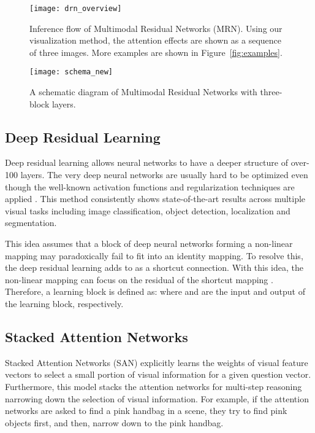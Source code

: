 \documentclass{article}
\begin{document}
\begin{figure}[t]
\centering
\begin{minipage}{.55\textwidth}
  \centering
  \texttt{[image: drn\_overview]}
  \caption{Inference flow of Multimodal Residual Networks (MRN). Using our visualization method, the attention effects are shown as a sequence of three images. More examples are shown in Figure~\ref{fig:examples}.}
  \label{fig:overview}
\end{minipage}
\hspace{26pt}
\begin{minipage}{.36\textwidth}
  \centering
  \texttt{[image: schema\_new]}
  \caption{A schematic diagram of Multimodal Residual Networks with three-block layers.}
  \label{fig:schema}
\end{minipage}
\end{figure}

\subsection{Deep Residual Learning}

Deep residual learning \cite{He2015} allows neural networks to have a deeper structure of over-100 layers. The very deep neural networks are usually hard to be optimized even though the well-known activation functions and regularization techniques are applied \cite{Nair2010,Hinton2012,Szegedy2015}. This method consistently shows state-of-the-art results across multiple visual tasks including image classification, object detection, localization and segmentation.

This idea assumes that a block of deep neural networks forming a non-linear mapping  may paradoxically fail to fit into an identity mapping. To resolve this, the deep residual learning adds  to  as a shortcut connection. With this idea, the non-linear mapping  can focus on the residual of the shortcut mapping . Therefore, a learning block is defined as: 
where  and  are the input and output of the learning block, respectively.

\subsection{Stacked Attention Networks}

Stacked Attention Networks (SAN) \cite{Yang2015} explicitly learns the weights of visual feature vectors to select a small portion of visual information for a given question vector. Furthermore, this model stacks the attention networks for multi-step reasoning narrowing down the selection of visual information. For example, if the attention networks are asked to find a pink handbag in a scene, they try to find pink objects first, and then, narrow down to the pink handbag. 
\end{document}

